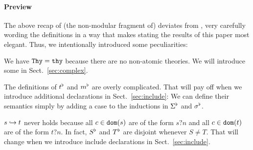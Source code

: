 \paragraph{Preview}
The above recap of (the non-modular fragment of) \mmt deviates from \cite{RK:mmt:10}, very carefully wording the definitions in a way that makes stating the results of this paper most elegant.
Thus, we intentionally introduced some peculiarities:
\begin{compactitem}
\item We have $\mathtt{Thy}=\mathtt{thy}$ because there are no non-atomic theories.
We will introduce some in Sect.~\ref{sec:complex}.
\item The definitions of $t^\flat$ and $m^\flat$ are overly complicated.
That will pay off when we introduce additional declarations in Sect.~\ref{sec:include}: We can define their semantics simply by adding a case to the inductions in $\Sigma^\flat$ and $\sigma^\flat$.
\item $s\hookrightarrow t$ never holds because all $c\in\mathtt{dom}(s)$ are of the form $s?n$ and all $c\in\mathtt{dom}(t)$ are of the form $t?n$.
In fact, $S^\flat$ and $T^\flat$ are disjoint whenever $S\neq T$.
That will change when we introduce include declarations in Sect.~\ref{sec:include}.
\end{compactitem}
